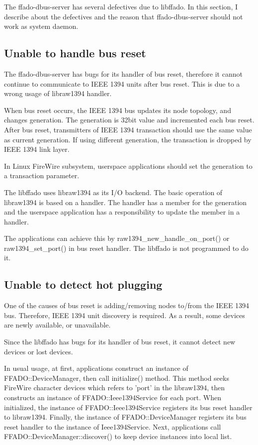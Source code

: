 \documentclass[onecolumn]{article}
\begin{document}
The ffado-dbus-server has several defectives due to libffado. In this section, I describe about the defectives and the reason that ffado-dbus-server should not work as system daemon.

\subsection{Unable to handle bus reset}

The ffado-dbus-server has bugs for its handler of bus reset, therefore it cannot continue to communicate to IEEE 1394 units after bus reset. This is due to a wrong usage of libraw1394 handler.

When bus reset occurs, the IEEE 1394 bus updates its node topology, and changes generation. The generation is 32bit value and incremented each bus reset. After bus reset, transmitters of IEEE 1394 transaction should use the same value as current generation. If using different generation, the transaction is dropped by IEEE 1394 link layer.

In Linux FireWire subsystem, userspace applications should set the generation to a transaction parameter.

The libffado uses libraw1394 as its I/O backend. The basic operation of libraw1394 is based on a handler. The handler has a member for the generation and the userspace application has a responsibility to update the member in a handler.

The applications can achieve this by raw1394\_new\_handle\_on\_port() or raw1394\_set\_port() in bus reset handler. The libffado is not programmed to do it.


\subsection{Unable to detect hot plugging}

One of the causes of bus reset is adding/removing nodes to/from the IEEE 1394 bus. Therefore, IEEE 1394 unit discovery is required. As a result, some devices are newly available, or unavailable.

Since the libffado has bugs for its handler of bus reset, it cannot detect new devices or lost devices.

In usual usage, at first, applications construct an instance of FFADO::DeviceManager, then call initialize() method. This method seeks FireWire character devices which refers to 'port' in the libraw1394, then constructs an instance of FFADO::Ieee1394Service for each port. When initialized, the instance of FFADO::Ieee1394Service registers its bus reset handler to libraw1394. Finally, the instance of FFADO::DeviceManager registers its bus reset handler to the instance of Ieee1394Service. Next, applications call FFADO::DeviceManager::discover() to keep device instances into local list.
\end{document}
